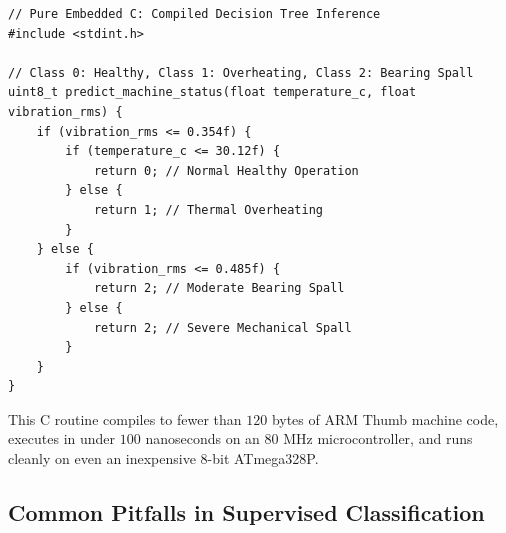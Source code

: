 \begin{iotbox}
\begin{lstlisting}[style=pythonstyle]
// Pure Embedded C: Compiled Decision Tree Inference
#include <stdint.h>

// Class 0: Healthy, Class 1: Overheating, Class 2: Bearing Spall
uint8_t predict_machine_status(float temperature_c, float vibration_rms) {
    if (vibration_rms <= 0.354f) {
        if (temperature_c <= 30.12f) {
            return 0; // Normal Healthy Operation
        } else {
            return 1; // Thermal Overheating
        }
    } else {
        if (vibration_rms <= 0.485f) {
            return 2; // Moderate Bearing Spall
        } else {
            return 2; // Severe Mechanical Spall
        }
    }
}
\end{lstlisting}
This C routine compiles to fewer than $120$ bytes of ARM Thumb machine code, executes in under $100$ nanoseconds on an 80 MHz microcontroller, and runs cleanly on even an inexpensive 8-bit ATmega328P.
\end{iotbox}

\subsection{Common Pitfalls in Supervised Classification}\label{subsec:classification_pitfalls}

